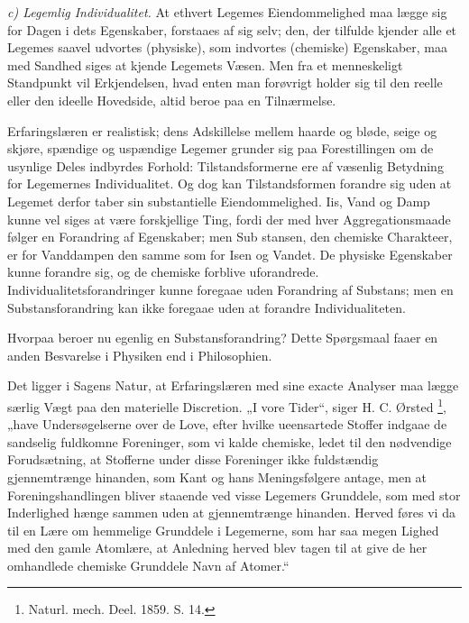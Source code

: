 \documentclass[12pt,a4paper]{book}
\newcommand{\runin}[1]{\emph{#1}\hspace{0.4em}}
\begin{document}
\runin{c) Legemlig Individualitet.} At ethvert Legemes
Eiendommelighed maa lægge sig for Dagen i dets Egenskaber, forstaaes
af sig selv; den, der tilfulde kjender alle et Legemes saavel udvortes
(physiske), som indvortes (chemiske) Egenskaber, maa med Sandhed siges
at kjende Legemets Væsen. Men fra et menneskeligt Standpunkt vil
Erkjendelsen, hvad enten man forøvrigt holder sig til den reelle eller
den ideelle Hovedside, altid beroe paa en Tilnærmelse.

Erfaringslæren er realistisk; dens Adskillelse mellem haarde og bløde,
seige og skjøre, spændige og uspændige Legemer grunder sig paa
Forestillingen om de usynlige Deles indbyrdes Forhold:
Tilstandsformerne ere af væsenlig Betydning for Legemernes
Individualitet. Og dog kan Tilstandsformen forandre sig uden at
Legemet derfor taber sin substantielle Eiendommelighed. Iis, Vand og
Damp kunne vel siges at være forskjellige Ting, fordi der med hver
Aggregationsmaade følger en Forandring af Egenskaber; men Sub\-%
stansen, den chemiske Charakteer, er for Vanddampen den samme som for
Isen og Vandet. De physiske Egenskaber kunne forandre sig, og de
chemiske forblive uforandrede. Individualitetsforandringer kunne
foregaae uden Forandring af Substans; men en Substansforandring kan
ikke foregaae uden at forandre Individualiteten.

Hvorpaa beroer nu egenlig en Substansforandring? Dette Spørgsmaal
faaer en anden Besvarelse i Physiken end i Philosophien.

Det ligger i Sagens Natur, at Erfaringslæren med sine exacte Analyser
maa lægge særlig Vægt paa den materielle Discretion. „I vore Tider“,
siger H. C. Ørsted%
\footnote{%
Naturl. mech. Deel. 1859. S. 14.}, „have Undersøgelserne over de
Love, efter hvilke ueensartede Stoffer indgaae de sandselig fuldkomne
Foreninger, som vi kalde chemiske, ledet til den nødvendige
Forudsætning, at Stofferne under disse Foreninger ikke fuldstændig
gjennemtrænge hinanden, som Kant og hans Meningsfølgere antage, men at
Foreningshandlingen bliver staaende ved visse Legemers Grunddele, som
med stor Inderlighed hænge sammen uden at gjennemtrænge hinanden.
Herved føres vi da til en Lære om hemmelige Grunddele i Legemerne, som
har saa megen Lighed med den gamle Atomlære, at Anledning herved blev
tagen til at give de her omhandlede chemiske Grunddele Navn af
Atomer.“
\end{document}
